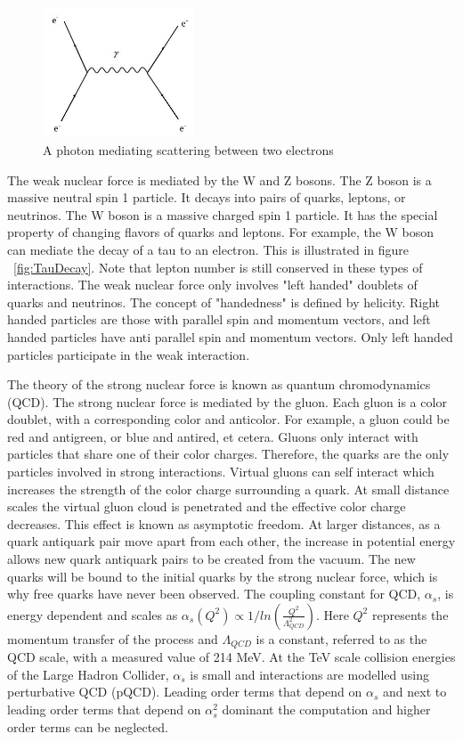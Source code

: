 \documentclass[oneside, letterpaper, oldfontcommands]{memoir}
\begin{document}
\begin{figure}[here]
\includegraphics[width=0.4\textwidth]{eeScattering.jpg}
\caption{A photon mediating scattering between two electrons}
\label{fig:eeScattering}
\end{figure}


\qquad The weak nuclear force is mediated by the W and Z bosons. The Z boson is a massive neutral spin 1 particle. It decays into pairs of quarks, leptons, or neutrinos. The W boson is a massive charged spin 1 particle. It has the special property of changing flavors of quarks and leptons. For example, the W boson can mediate the decay of a tau to an electron. This is illustrated in figure ~\ref{fig:TauDecay}. Note that lepton number is still conserved in these types of interactions. The weak nuclear force only involves "left handed" doublets of quarks and neutrinos. The concept of "handedness" is defined by helicity. Right handed particles are those with parallel spin and momentum vectors, and left handed particles have anti parallel spin and momentum vectors. Only left handed particles participate in the weak interaction.

\qquad The theory of the strong nuclear force is known as quantum chromodynamics (QCD). The strong nuclear force is mediated by the gluon. Each gluon is a color doublet, with a corresponding color and anticolor. For example, a gluon could be red and antigreen, or blue and antired, et cetera. Gluons only interact with particles that share one of their color charges. Therefore, the quarks are the only particles involved in strong interactions. Virtual gluons can self interact which increases the strength of the color charge surrounding a quark. At small distance scales the virtual gluon cloud is penetrated and the effective color charge decreases. This effect is known as asymptotic freedom. \cite{Halzen:1984mc} At larger distances, as a quark antiquark pair move apart from each other, the increase in potential energy allows new quark antiquark pairs to be created from the vacuum. The new quarks will be bound to the initial quarks by the strong nuclear force, which is why free quarks have never been observed. 
\qquad The coupling constant for QCD, $\alpha_{s}$, is energy dependent and scales as $\alpha_{s}(Q^{2}) \propto 1/ln(\frac{Q^{2}}{\Lambda_{QCD}^{2}})$. Here $Q^{2}$ represents the momentum transfer of the process and $\Lambda_{QCD}$ is a constant, referred to as the QCD scale, with a measured value of 214 MeV\cite{Agashe:2014kda}. At the TeV scale collision energies of the Large Hadron Collider, $\alpha_{s}$ is small and interactions are modelled using perturbative QCD (pQCD). Leading order terms that depend on $\alpha_{s}$ and next to leading order terms that depend on $\alpha_{s}^{2}$ dominant the computation and higher order terms can be neglected.
\end{document}
